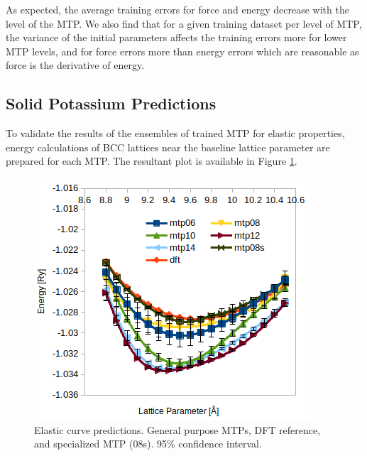 \documentclass[9pt,twocolumn,twoside]{opticajnl}
\begin{document}
As expected, the average training errors for force and energy decrease with the level of the MTP. We also find that for a given training dataset per level of MTP, the variance of the initial parameters affects the training errors more for lower MTP levels, and for force errors more than energy errors which are reasonable as force is the derivative of energy. 

\subsection{Solid Potassium Predictions}
To validate the results of the ensembles of trained MTP for elastic properties, energy calculations of BCC lattices near the baseline lattice parameter are prepared for each MTP. The resultant plot is available in Figure \ref{fig:elastic}.

\begin{figure}[ht]
  \centering
  \includegraphics[width=\linewidth]{assets/curve.png}
  \caption{Elastic curve predictions. General purpose MTPs, DFT reference, and specialized MTP (08s). 95\% confidence interval.}
  \label{fig:elastic}
\end{figure}
\end{document}
